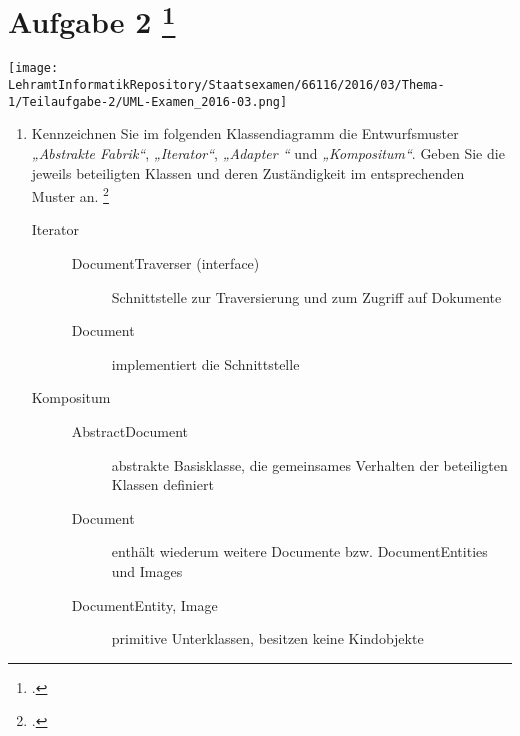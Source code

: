 \documentclass{lehramt-informatik-aufgabe}
\begin{document}
\section{Aufgabe 2
\footcite[Thema 1 Teilaufgabe 2 Aufgabe 2]{examen:66116:2016:03}
}

\texttt{[image: \\LehramtInformatikRepository/Staatsexamen/66116/2016/03/Thema-1/Teilaufgabe-2/UML-Examen\_2016-03.png]}

\begin{enumerate}


\item Kennzeichnen Sie im folgenden
Klassendiagramm die Entwurfsmuster
\emph{„Abstrakte Fabrik“},
\emph{„Iterator“}, \emph{„Adapter
“} und \emph{„Kompositum“}.
Geben Sie die jeweils beteiligten Klassen und deren Zuständigkeit im
entsprechenden Muster an.
\footcite{sosy:ab:6}

\begin{antwort}

\begin{description}

%

\item[Iterator] \strut

\begin{description}
\item[DocumentTraverser (interface)]
Schnittstelle zur Traversierung und zum Zugriff auf Dokumente

\item[Document]
implementiert die Schnittstelle
\end{description}

%

\item[Kompositum] \strut

\begin{description}
\item[AbstractDocument]
abstrakte Basisklasse, die gemeinsames Verhalten der beteiligten
Klassen definiert

\item[Document]
enthält wiederum weitere Documente bzw. DocumentEntities und Images

\item[DocumentEntity, Image]
primitive Unterklassen, besitzen keine Kindobjekte
\end{description}


\end{description}
\end{antwort}
\end{enumerate}
\end{document}
